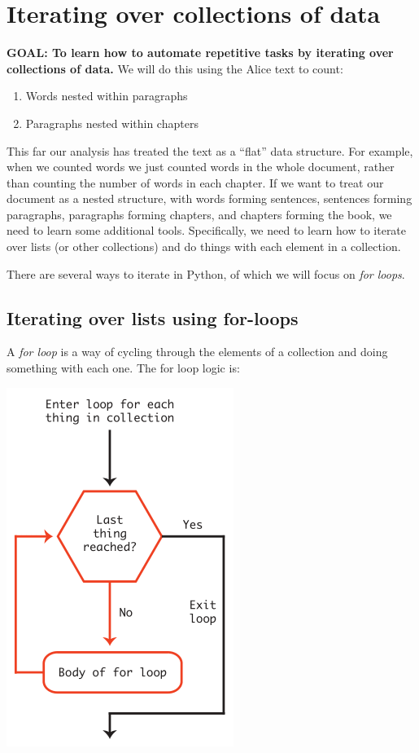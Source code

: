 \documentclass[
]{book}
\providecommand{\tightlist}{%
  \setlength{\itemsep}{0pt}\setlength{\parskip}{0pt}}
\begin{document}
\hypertarget{iterating-over-collections-of-data}{%
\section{Iterating over collections of data}\label{iterating-over-collections-of-data}}

\textbf{GOAL: To learn how to automate repetitive tasks by iterating over collections of data.} We will do this using the Alice text to count:

\begin{enumerate}
\def\labelenumi{\arabic{enumi}.}
\tightlist
\item
  Words nested within paragraphs
\item
  Paragraphs nested within chapters
\end{enumerate}

This far our analysis has treated the text as a ``flat'' data structure. For example, when we counted words we just counted words in the whole document, rather than counting the number of words in each chapter. If we want to treat our document as a nested structure, with words forming sentences, sentences forming paragraphs, paragraphs forming chapters, and chapters forming the book, we need to learn some additional tools. Specifically, we need to learn how to iterate over lists (or other collections) and do things with each element in a collection.

There are several ways to iterate in Python, of which we will focus on \emph{for loops}.

\hypertarget{iterating-over-lists-using-for-loops}{%
\subsection{Iterating over lists using for-loops}\label{iterating-over-lists-using-for-loops}}

A \emph{for loop} is a way of cycling through the elements of a collection and doing something with each one. The for loop logic is:

\includegraphics{Python/PythonIntro/images/for_loop_pic_small.png}
\end{document}
